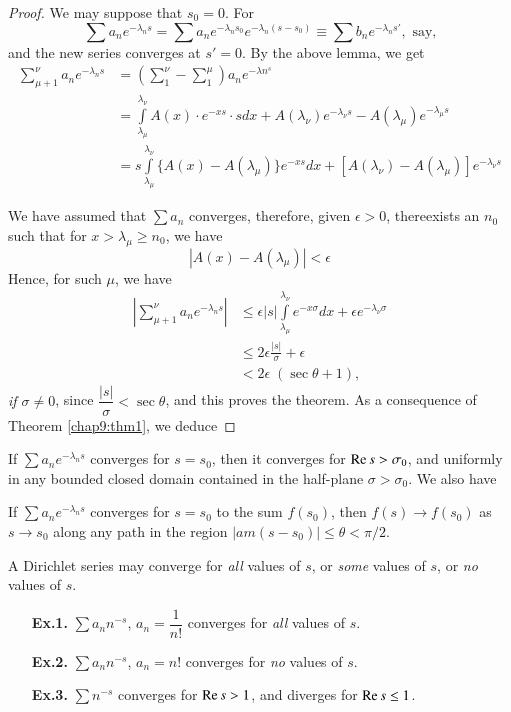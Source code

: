 \begin{proof}
We may suppose that $s_0=0$. For 
$$
\sum a_n e^{-\lambda_ns} = \sum a_n e^{-\lambda_n s_0}
e^{-\lambda_{n}(s-s_0)} \equiv \sum b_n e^{-\lambda_n s'}, \text{ say,}
$$
and the new series converges at $s'=0$. By the above lemma, we
get
\begin{align*}
\sum\limits^\nu_{\mu+1} a_n e^{-\lambda_n s} & =
\left(\sum\limits^{\nu}_1 - \sum\limits^\mu_1 \right) a_n e^{-\lambda
  n^s}\\
& = \int\limits^{\lambda_\nu}_{\lambda_{\mu}} A(x) \cdot e^{-xs} \cdot
s dx + A(\lambda_\nu) e^{-\lambda_\nu s} - A (\lambda_\mu)
e^{-\lambda_\mu s}\\
& = s \int\limits^{\lambda_\nu}_{\lambda_\mu} \{A(x) -
A(\lambda_\mu)\} e^{-xs} dx + [A(\lambda_\nu) - A (\lambda_\mu)]
e^{-\lambda_\nu s}
\end{align*}

We have assumed that $\sum a_n$ converges, therefore, given $\epsilon > 0$,
there\pageoriginale exists an $n_0$ such that for $x > \lambda_\mu
\geq n_0$, we have
$$
|A(x) - A (\lambda_\mu)| < \epsilon
$$
Hence, for such $\mu$, we have
\begin{align*}
\left|\sum\limits^\nu_{\mu+1} a_n e^{-\lambda_n s} \right| & \leq
\epsilon |s| \int\limits^{\lambda_\nu}_{\lambda_\mu} e^{-x\sigma}
dx + \epsilon e^{-\lambda_\nu \sigma}\\
& \leq 2 \epsilon \frac{|s|}{\sigma} + \epsilon\\
& < 2 \epsilon \; (\sec \theta + 1),
\end{align*}
\textit{if $\sigma \neq 0$}, since $\dfrac{|s|}{\sigma} < \sec
\theta$, and this proves the theorem. As a consequence of Theorem \ref{chap9:thm1},
we deduce
\end{proof}

\begin{thm}\label{chap9:thm2}
If $\sum a_n e^{-\lambda_ns}$ converges for $s = s_0$, then it
converges for $\operatorname{Re} s > \sigma_0$, and uniformly in any bounded closed
domain contained in the half-plane $\sigma > \sigma_0$. We also have 
\end{thm}

\begin{thm}\label{chap9:thm3}
If $\sum a_n e^{-\lambda_ns}$ converges for $s = s_0$ to the sum
$f(s_0)$, then $f(s) \to f(s_0)$ as $s \to s_0$ along any path in the
region $|am (s-s_0)| \leq \theta < \pi/2$.
\end{thm}

A Dirichlet series may converge for \textit{all} values of $s$, or
\textit{some} values of $s$, or \textit{no} values of $s$.
\begin{itemize}
\item[{\bf{Ex.1.}}] $\sum a_n n^{-s}$, $a_n = \dfrac{1}{n!}$
converges for \textit{all} values of $s$.

\item[{\bf{Ex.2.}}] $\sum a_n n^{-s}$, $a_n = n!$ converges for
  \textit{no} values of $s$.

\item[{\bf{Ex.3.}}] $\sum n^{-s}$ converges for $\operatorname{Re} s >1$, and
  diverges for $\operatorname{Re} s \leq 1$.
\end{itemize}

